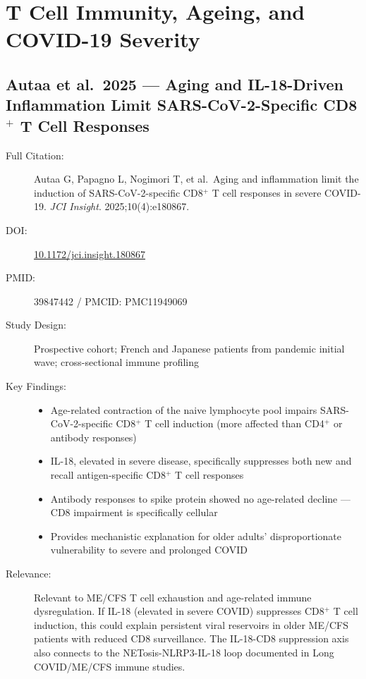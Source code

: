 \section{T Cell Immunity, Ageing, and COVID-19 Severity}
\label{sec:bib-tcell-aging-2026}

\subsection{Autaa et al.\ 2025 --- Aging and IL-18-Driven Inflammation Limit SARS-CoV-2-Specific CD8$^+$ T Cell Responses}

\begin{description}
    \item[Full Citation:] Autaa G, Papagno L, Nogimori T, et al.\ Aging and inflammation limit the induction of SARS-CoV-2-specific CD8$^+$ T cell responses in severe COVID-19. \textit{JCI Insight}. 2025;10(4):e180867. \cite{Autaa2025CD8Aging}
    \item[DOI:] \href{https://doi.org/10.1172/jci.insight.180867}{10.1172/jci.insight.180867}
    \item[PMID:] 39847442 / PMCID: PMC11949069
    \item[Study Design:] Prospective cohort; French and Japanese patients from pandemic initial wave; cross-sectional immune profiling
    \item[Key Findings:]
    \begin{itemize}
        \item Age-related contraction of the naive lymphocyte pool impairs SARS-CoV-2-specific CD8$^+$ T cell induction (more affected than CD4$^+$ or antibody responses)
        \item IL-18, elevated in severe disease, specifically suppresses both new and recall antigen-specific CD8$^+$ T cell responses
        \item Antibody responses to spike protein showed no age-related decline --- CD8 impairment is specifically cellular
        \item Provides mechanistic explanation for older adults' disproportionate vulnerability to severe and prolonged COVID
    \end{itemize}
    \item[Relevance:] Relevant to ME/CFS T cell exhaustion and age-related immune dysregulation. If IL-18 (elevated in severe COVID) suppresses CD8$^+$ T cell induction, this could explain persistent viral reservoirs in older ME/CFS patients with reduced CD8 surveillance. The IL-18-CD8 suppression axis also connects to the NETosis-NLRP3-IL-18 loop documented in Long COVID/ME/CFS immune studies.

\end{description}
